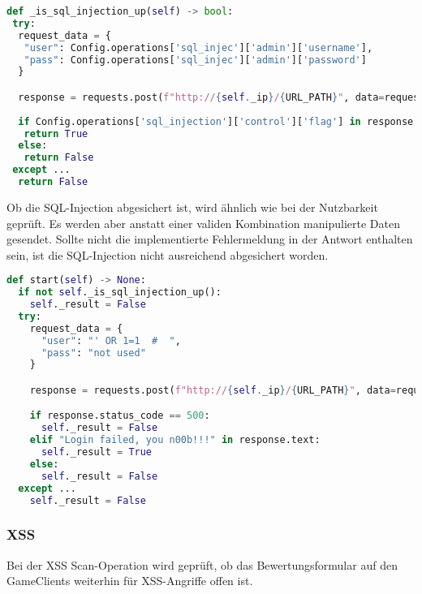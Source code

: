 \begin{lstlisting}[language=Python, frame=single, caption={Big Brother SQL-Injection UP}, captionpos=b, label={lst:bigbrother-sql-injection-up}]
def _is_sql_injection_up(self) -> bool:
 try:
  request_data = {
   "user": Config.operations['sql_injec']['admin']['username'],
   "pass": Config.operations['sql_injec']['admin']['password']
  }

  response = requests.post(f"http://{self._ip}/{URL_PATH}", data=request_data)
  
  if Config.operations['sql_injection']['control']['flag'] in response.text and Config.operations['sql_injection']['control']['value'] in response.text:
   return True
  else:
   return False
 except ...
  return False
\end{lstlisting}

Ob die SQL-Injection abgesichert ist, wird ähnlich wie bei der Nutzbarkeit geprüft. Es werden aber anstatt einer validen Kombination manipulierte Daten gesendet. Sollte nicht die implementierte Fehlermeldung  in der Antwort enthalten sein, ist die SQL-Injection nicht ausreichend abgesichert worden.

\begin{lstlisting}[language=Python, frame=single, caption={Big Brother SQL-Injection Save}, captionpos=b, label={lst:bigbrother-sql-injection-save}]
def start(self) -> None:
  if not self._is_sql_injection_up():
    self._result = False
  try:
    request_data = {
      "user": "' OR 1=1  #  ",
      "pass": "not used"
    }

    response = requests.post(f"http://{self._ip}/{URL_PATH}", data=request_data)

    if response.status_code == 500:
      self._result = False
    elif "Login failed, you n00b!!!" in response.text:
      self._result = True
    else:
      self._result = False
  except ...
    self._result = False
\end{lstlisting}

\subsubsection{XSS}
Bei der XSS Scan-Operation wird geprüft, ob das Bewertungsformular auf den GameClients weiterhin für XSS-Angriffe offen ist.

